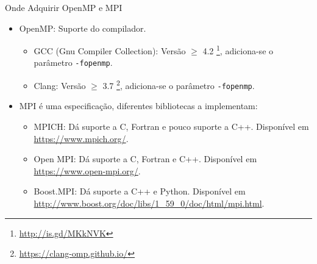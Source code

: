 \begin{frame}{Onde Adquirir OpenMP e MPI}
	\begin{itemize}
		\item OpenMP: Suporte do compilador.
		\medskip
		\begin{itemize}
			\item GCC (Gnu Compiler Collection): Versão $\geq$ 4.2 \footnote{\url{http://is.gd/MKkNVK}}, adiciona-se o parâmetro \texttt{-fopenmp}.
			\smallskip
			\item Clang: Versão $\geq$ 3.7 \footnote{\url{https://clang-omp.github.io/}}, adiciona-se o parâmetro \texttt{-fopenmp}.
		\end{itemize}
		\bigskip
		\item MPI é uma especificação, diferentes bibliotecas a implementam:
		\begin{itemize}
			\item MPICH: Dá suporte a C, Fortran e pouco suporte a C++. Disponível em \url{https://www.mpich.org/}.
			\smallskip
			\item Open MPI: Dá suporte a C, Fortran e C++. Disponível em \url{https://www.open-mpi.org/}.
			\smallskip
			\item Boost.MPI: Dá suporte a C++ e Python. Disponível em \url{http://www.boost.org/doc/libs/1_59_0/doc/html/mpi.html}.
		\end{itemize}
	\end{itemize}
\end{frame}

